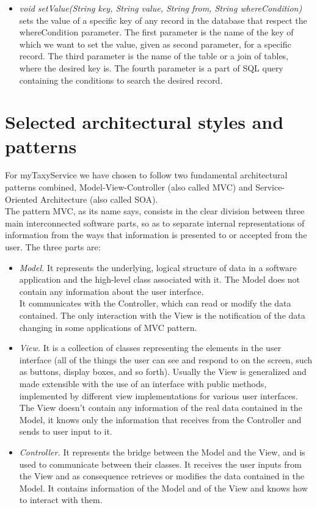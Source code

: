 \documentclass[\mainpath/main]{subfiles}
\begin{document}
\begin{itemize}
\begin{itemize}
		\item \textit{void setValue(String key, String value, String from, String whereCondition)}
		sets the value of a specific key of any record in the database that respect the whereCondition parameter. The first parameter is the name of the key of which we want to set the value, given as second parameter, for a specific record. The third parameter is the name of the table or a join of tables, where the desired key is. The fourth parameter is a part of SQL query containing the conditions to search the desired record.
	\end{itemize}
		
	
\end{itemize}



\section{Selected architectural styles and patterns}
\label{ArchitecturalDesign:design_patterns}
For myTaxyService we have chosen to follow two fundamental architectural patterns combined, Model-View-Controller (also called MVC) and Service-Oriented Architecture (also called SOA).\\
The pattern MVC, as its name says, consists in the clear division between three main interconnected software parts, so as to separate internal representations of information from the ways that information is presented to or accepted from the user. The three parts are:
\begin{itemize}
	\item \textit{Model.} It represents the underlying, logical structure of data in a software application and the high-level class associated with it. The Model does not contain any information about the user interface.\\
	It communicates with the Controller, which can read or modify the data contained. The only interaction with the View is the notification of the data changing in some applications of MVC pattern.
	
	\item \textit{View.} It is a collection of classes representing the elements in the user interface (all of the things the user can see and respond to on the screen, such as buttons, display boxes, and so forth). Usually the View is generalized and made extensible with the use of an interface with public methods, implemented by different view implementations for various user interfaces.\\
	The View doesn't contain any information of the real data contained in the Model, it knows only the information that receives from the Controller and sends to user input to it.
	
	
	\item \textit{Controller.} It represents the bridge between the Model and the View, and is used to communicate between their classes. It receives the user inputs from the View and as consequence retrieves or modifies the data contained in the Model. It contains information of the Model and of the View and knows how to interact with them.\\
\end{itemize}
\end{document}
